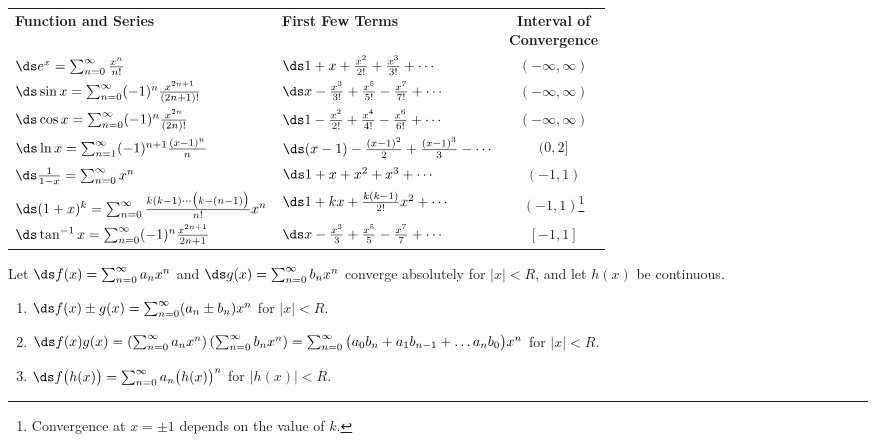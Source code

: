 \setboxwidth{110pt}
{%
\noindent\begin{tabular}{llc}
\textbf{Function and Series} & \textbf{First Few Terms} & \parbox{50pt}{\centering\textbf{Interval of}\\\textbf{Convergence}} \\
\rule{0pt}{25pt}$\ds e^x = \sum_{n=0}^\infty \frac{x^n}{n!}$ & $\ds 1+ x+\frac{x^2}{2!} + \frac{x^3}{3!}+\cdots$ & $(-\infty,\infty)$\\
\rule{0pt}{25pt}$\ds \sin x = \sum_{n=0}^\infty (-1)^n\frac{x^{2n+1}}{(2n+1)!}$ & $\ds x-\frac{x^3}{3!}+\frac{x^5}{5!} - \frac{x^7}{7!}+\cdots$ & $(-\infty,\infty)$\\
\rule{0pt}{25pt}$\ds \cos x = \sum_{n=0}^\infty (-1)^n\frac{x^{2n}}{(2n)!}$ & $\ds 1-\frac{x^2}{2!}+\frac{x^4}{4!} - \frac{x^6}{6!} +\cdots$ & $(-\infty,\infty)$\\
\rule{0pt}{25pt}$\ds \ln x = \sum_{n=1}^\infty(-1)^{n+1}\frac{(x-1)^n}{n}$ & $\ds (x-1)- \frac{(x-1)^2}{2} +\frac{(x-1)^3}{3}-\cdots$& $(0,2]$\\
\rule{0pt}{25pt}$\ds \frac{1}{1-x} = \sum_{n=0}^\infty x^n$ &$\ds 1+x+x^2+x^3+\cdots$& $(-1,1)$\\
\rule{0pt}{25pt}\small$\ds (1+x)^k=\sum_{n=0}^\infty \frac{k(k-1)\cdots\big(k-(n-1)\big)}{n!}x^n$ \normalsize& $\ds 1+kx+\frac{k(k-1)}{2!}x^2 + \cdots$ & $(-1,1)$\footnote{Convergence at $x=\pm1$ depends on the value of $k$.}\\
\rule{0pt}{25pt}$\ds \tan^{-1}x = \sum_{n=0}^\infty (-1)^n\frac{x^{2n+1}}{2n+1}$ & $\ds x-\frac{x^3}{3}+\frac{x^5}{5}-\frac{x^7}{7}+\cdots$ & $[-1,1]$
\end{tabular}}

{Let $\ds f(x) = \sum_{n=0}^\infty a_nx^n$ and $\ds g(x) = \sum_{n=0}^\infty b_nx^n$ converge absolutely for $|x|<R$, and let $h(x)$ be continuous.
\begin{enumerate}
	\item $\ds f(x)\pm g(x) = \sum_{n=0}^\infty (a_n\pm b_n)x^n$ \quad for $|x|<R$.
	\item	$\ds 	f(x)g(x) = \left(\sum_{n=0}^\infty a_nx^n\right)\left(\sum_{n=0}^\infty b_nx^n\right) = \sum_{n=0}^\infty\big(a_0b_n+a_1b_{n-1}+\ldots a_nb_0\big)x^n
		$ for $|x|<R$.
	
	\item		$\ds f\big(h(x)\big) = \sum_{n=0}^\infty a_n\big(h(x)\big)^n$ \quad for $|h(x)|<R$.

\end{enumerate}}

